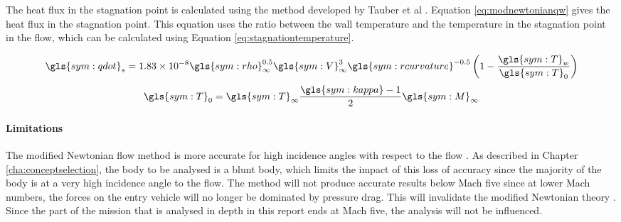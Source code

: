 The heat flux in the stagnation point is calculated using the method developed by Tauber et al \cite{Tauber1986}. Equation \ref{eq:modnewtonianqw} gives the heat flux in the stagnation point. This equation uses the ratio between the wall temperature and the temperature in the stagnation point in the flow, which can be calculated using Equation \ref{eq:stagnationtemperature}\cite{AndersonJr.2006}.


	\begin{equation} \label{eq:modnewtonianqw}
		\gls{sym:qdot}_{s} = 1.83 \times 10^{-8} \gls{sym:rho}_{\infty}^{0.5} \gls{sym:V}_{\infty}^3  \gls{sym:rcurvature}^{-0.5} \left(1-\frac{\gls{sym:T}_{w}}{\gls{sym:T}_0}\right)
	\end{equation} \break
	\begin{equation}
		\gls{sym:T}_0 = \gls{sym:T}_\infty \frac{\gls{sym:kappa}-1}{2}\gls{sym:M}_\infty
		\label{eq:stagnationtemperature}
	\end{equation}
	


\paragraph{Limitations}
The modified Newtonian flow method is more accurate for high incidence angles with respect to the flow \cite{AndersonJr.2006}. As described in Chapter \ref{cha:conceptselection}, the body to be analysed is a blunt body, which limits the impact of this loss of accuracy since the majority of the body is at a very high incidence angle to the flow. The method will not produce accurate results below Mach five since at lower Mach numbers, the forces on the entry vehicle will no longer be dominated by pressure drag. This will invalidate the modified Newtonian theory \cite{AndersonJr.2006}.
Since the part of the mission that is analysed in depth in this report ends at Mach five, the analysis will not be influenced.

